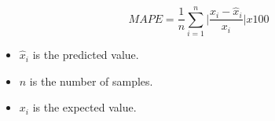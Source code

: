 \begin{equation}\label{eq:MAPE}
    MAPE = \frac{1}{n} \sum_{i=1}^{n} \bigg| \frac{x_i - \hat{x}_i}{x_i} \bigg| x 100
\end{equation}

\begin{itemize}
    \item \begin{math}\hat{x}_i\end{math} is the predicted value.
    \item \begin{math}n\end{math} is the number of samples.
    \item \begin{math}x_i\end{math} is the expected value.
\end{itemize}




